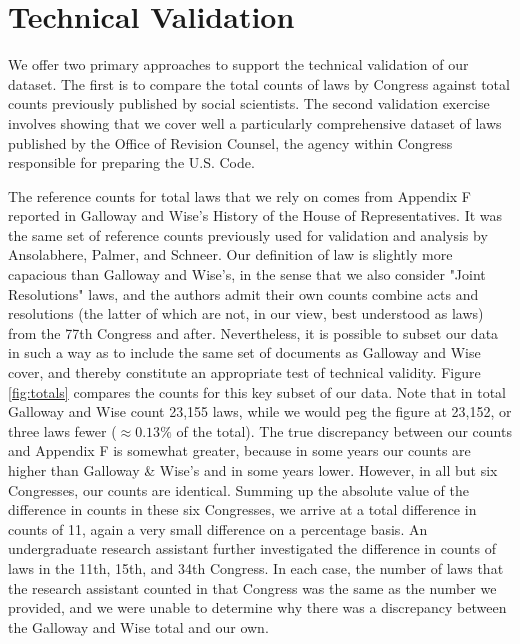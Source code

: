 \documentclass[fleqn,10pt]{wlscirep}
\begin{document}

\section*{Technical Validation}


We offer two primary approaches to support the technical validation of our dataset. The first is to compare the total counts of laws by Congress against total counts previously published by social scientists. The second validation exercise involves showing that we cover well a particularly comprehensive dataset of laws published by the Office of Revision Counsel, the agency within Congress  responsible for preparing the U.S. Code.

The reference counts for total laws that we rely on comes from Appendix F reported in Galloway and Wise's History of the House of Representatives\nocite{gallowaywise}. It was the same set of reference counts previously used for validation and analysis by Ansolabhere, Palmer, and Schneer.\cite{ansolabehere_palmer_schneer_2016} Our definition of law is slightly more capacious than Galloway and Wise's, in the sense that we also consider "Joint Resolutions" laws, and the authors admit their own counts combine acts and resolutions (the latter of which are not, in our view, best understood as laws) from the 77th Congress and after. Nevertheless, it is possible to subset our data in such a way as to include the same set of documents as Galloway and Wise cover, and thereby constitute an appropriate test of technical validity. Figure \ref{fig:totals} compares the counts for this key subset of our data. Note that in total Galloway and Wise count 23,155 laws, while we would peg the figure at 23,152, or three laws fewer ($\approx 0.13\%$ of the total). The true discrepancy between our counts and Appendix F is somewhat greater, because in some years our counts are higher than Galloway \& Wise's and in some years lower. However, in all but six Congresses, our counts are identical. Summing up the absolute value of the difference in counts in these six Congresses, we arrive at a total difference in counts of 11, again a very small difference on a percentage basis. An undergraduate research assistant further investigated the difference in counts of laws in  the 11th, 15th, and 34th Congress. In each case, the number of laws that the research assistant counted in that Congress was the same as the number we provided, and we were unable to determine why there was a discrepancy between the Galloway and Wise total and our own. 
\end{document}
